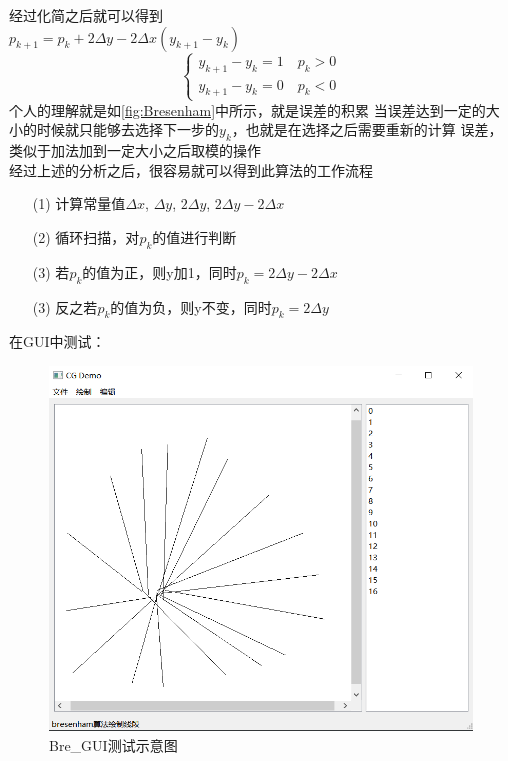 \documentclass[a4paper,UTF8]{article}
\theoremstyle{definition}
\begin{document}
经过化简之后就可以得到\\
$p_{k+1}=p_k+2\Delta y-2\Delta x( y_{k+1}-y_k)$\\
$$
\begin{cases}
    y_{k+1}-y_k=1 \quad \text{$p_k>0$}\\
    y_{k+1}-y_k=0 \quad \text{$p_k<0$}
\end{cases}
$$
个人的理解就是如\ref{fig:Bresenham}中所示，就是误差的积累
当误差达到一定的大小的时候就只能够去选择下一步的$y_k$，也就是在选择之后需要重新的计算
误差，类似于加法加到一定大小之后取模的操作\\
经过上述的分析之后，很容易就可以得到此算法的工作流程\\
\begin{itemize}
    \item [(1)] 
    计算常量值$\Delta{x}$, $\Delta{y}$, $2\Delta{y}$, $2\Delta{y}-2\Delta{x}$
    \item [(2)]
    循环扫描，对$p_k$的值进行判断
    \item [(3)]
    若$p_k$的值为正，则y加1，同时$p_k=2\Delta{y}-2\Delta{x}$
    \item [(3)]
    反之若$p_k$的值为负，则y不变，同时$p_k=2\Delta{y}$
\end{itemize}

在GUI中测试：\\

\begin{figure}[h]
	\centering
	\includegraphics[scale=0.4]{figure/Bre_GUI.png}
	\caption{Bre\_GUI测试示意图}
	\label{fig:Bre_GUI}
\end{figure}
\end{document}
